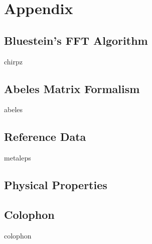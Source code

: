 \documentclass[a4paper,titlepage,onecolumn]{report}
\begin{document}
\chapter{Appendix}
 \section{Bluestein's FFT Algorithm}
 {chirpz}
        \section{Abeles Matrix Formalism} \label{ch:abeles}
        {abeles}
        \section{Reference Data} \label{ch:reference}
        {metaleps}
        \section{Physical Properties}
        \label{ref:physicalproperties}
        \section{Colophon}
        {colophon}



\end{document}
